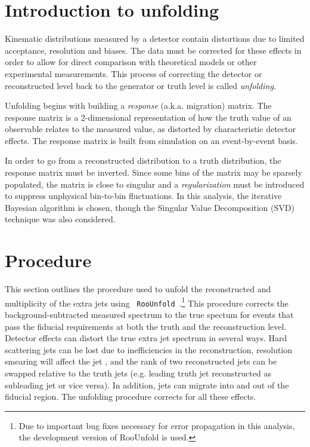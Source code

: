 \section{Introduction to unfolding}
Kinematic distributions measured by a detector contain distortions due to limited acceptance, resolution and biases. The data must be corrected for these effects in order to allow for direct comparison with theoretical models or other experimental measurements. This process of correcting the detector or reconstructed level back to the generator or truth level is called \emph{unfolding}.


Unfolding begins with building a \emph{response} (a.k.a. migration) matrix. The response matrix is a 2-dimensional representation of how the truth value of an observable relates to the measured value, as distorted by characteristic detector effects. The response matrix is built from simulation on an event-by-event basis.

In order to go from a reconstructed distribution to a truth distribution, the response matrix must be inverted. Since some bins of the matrix may be sparsely populated, the matrix is close to singular and a \emph{regularization} must be introduced to suppress unphysical bin-to-bin fluctuations. In this analysis, the iterative Bayesian algorithm is chosen, though the Singular Value Decomposition (SVD) technique was also considered.

\section{Procedure}
This section outlines the procedure used to unfold the reconstructed \pt and multiplicity of the 
extra jets using \texttt{ RooUnfold}~\cite{roounfold}.\footnote{Due to important bug fixes necessary for error propagation in this analysis, the development version of RooUnfold is used.}
This procedure corrects the background-subtracted measured spectrum to the true
spectum for events that pass the fiducial requirements at both the truth and the reconstruction level.
Detector effects can distort the true extra jet spectrum in several ways.  Hard scattering jets can be lost due to
inefficiencies in the reconstruction, resolution smearing will affect the jet \pt, and the rank of two
reconstructed jets can be swapped relative to the truth jets  (e.g. leading truth jet reconstructed as subleading jet or vice versa).
In addition, jets can migrate  into and out of the fiducial region.  The unfolding procedure corrects for all these effects.


